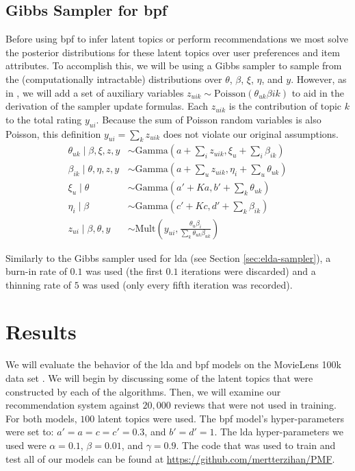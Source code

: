 \documentclass{article} %
\begin{document}
\subsection{Gibbs Sampler for \acrlong{bpf}}
Before using \gls{bpf} to infer latent topics or perform recommendations we most solve the posterior distributions for these latent topics over user preferences and item attributes. To accomplish this, we will be using a Gibbs sampler to sample from the (computationally intractable) distributions over $\theta$, $\beta$, $\xi$, $\eta$, and $y$. However, as in \cite{gopalan2013scalable}, we will add a set of auxiliary variables $z_{uik} \sim \mathrm{Poisson} \left ( \theta_{uk} \beta{ik} \right )$ to aid in the derivation of the sampler update formulas. Each $z_{uik}$ is the contribution of topic $k$ to the total rating $y_{ui}$. Because the sum of Poisson random variables is also Poisson, this definition $y_{ui} = \sum_k z_{uik}$ does not violate our original assumptions.
\begin{align*}
	\theta_{uk} \mid \beta, \xi, z, y &\sim \mathrm{Gamma}\left(a + \sum_i z_{uik}, \xi_u + \sum_i \beta_{ik} \right) \\
	\beta_{ik} \mid \theta, \eta, z, y &\sim \mathrm{Gamma}\left (a + \sum_u z_{uik}, \eta_i + \sum_u \theta_{uk} \right ) \\
	\xi_u \mid \theta &\sim \mathrm{Gamma}\left (a' + Ka, b' + \sum_k \theta_{uk} \right ) \\
	\eta_i \mid \beta &\sim \mathrm{Gamma} \left (c' + Kc, d' + \sum_k \beta_{ik} \right ) \\
	z_{ui} \mid \beta, \theta, y &\sim \mathrm{Mult} \left (y_{ui}, \frac{\theta_u \beta_i}{\sum_k \theta_{uk} \beta_{uk}} \right )
\end{align*}

Similarly to the Gibbs sampler used for \gls{lda} (see Section \ref{sec:elda-sampler}), a burn-in rate of $0.1$ was used (the first $0.1$ iterations were discarded) and a thinning rate of $5$ was used (only every fifth iteration was recorded).

\section{Results}
We will evaluate the behavior of the \gls{lda} and \gls{bpf} models on the MovieLens 100k data set \cite{movielens100k}. We will begin by discussing some of the latent topics that were constructed by each of the algorithms. Then, we will examine our recommendation system against $20,000$ reviews that were not used in training. For both models, $100$ latent topics were used. The \gls{bpf} model's hyper-parameters were set to: $a' = a = c = c' = 0.3$, and $b' = d' = 1$. The \gls{lda} hyper-parameters we used were $\alpha = 0.1$, $\beta = 0.01$, and $\gamma = 0.9$. The code that was used to train and test all of our models can be found at \url{https://github.com/mertterzihan/PMF}.
\end{document}

